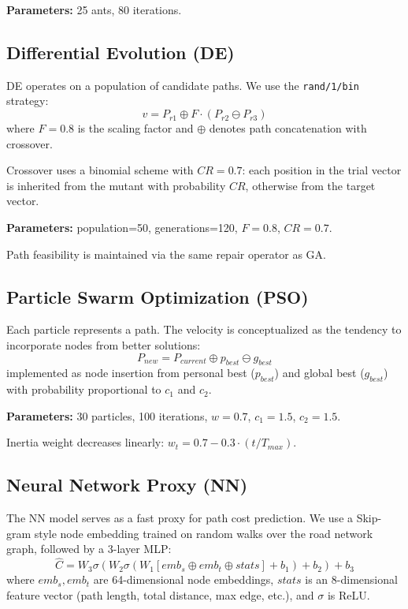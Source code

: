 \documentclass[journal]{IEEEtran}
\begin{document}
\textbf{Parameters:} 25 ants, 80 iterations.

\subsection{Differential Evolution (DE)}
DE operates on a population of candidate paths. We use the \texttt{rand/1/bin} strategy:
\begin{equation}
\label{eq:de_mutant}
v = P_{r1} \oplus F \cdot (P_{r2} \ominus P_{r3})
\end{equation}
where $F=0.8$ is the scaling factor and $\oplus$ denotes path concatenation with crossover.

Crossover uses a binomial scheme with $CR=0.7$: each position in the trial vector is inherited from the mutant with probability $CR$, otherwise from the target vector.

\textbf{Parameters:} population=50, generations=120, $F=0.8$, $CR=0.7$.

Path feasibility is maintained via the same repair operator as GA.

\subsection{Particle Swarm Optimization (PSO)}
Each particle represents a path. The velocity is conceptualized as the tendency to incorporate nodes from better solutions:
\begin{equation}
\label{eq:pso}
P_{new} = P_{current} \oplus p_{best} \ominus g_{best}
\end{equation}
implemented as node insertion from personal best ($p_{best}$) and global best ($g_{best}$) with probability proportional to $c_1$ and $c_2$.

\textbf{Parameters:} 30 particles, 100 iterations, $w=0.7$, $c_1=1.5$, $c_2=1.5$.

Inertia weight decreases linearly: $w_t = 0.7 - 0.3 \cdot (t / T_{max})$.

\subsection{Neural Network Proxy (NN)}
The NN model serves as a fast proxy for path cost prediction. We use a Skip-gram style node embedding trained on random walks over the road network graph, followed by a 3-layer MLP:
\begin{equation}
\label{eq:nn_mlp}
\hat{C} = W_3 \sigma(W_2 \sigma(W_1 [emb_s \oplus emb_t \oplus stats] + b_1) + b_2) + b_3
\end{equation}
where $emb_s, emb_t$ are 64-dimensional node embeddings, $stats$ is an 8-dimensional feature vector (path length, total distance, max edge, etc.), and $\sigma$ is ReLU.
\end{document}
